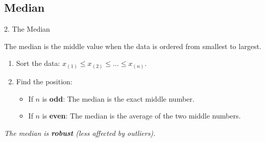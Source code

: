 \subsection{Median}
\begin{frame}{2. The Median}
    \begin{definition}[Median]
        The \alert{median} is the middle value when the data is ordered from smallest to largest.
    \end{definition}
    
    \begin{recipe}
        \begin{enumerate}
            \item Sort the data: $x_{(1)} \le x_{(2)} \le \dots \le x_{(n)}$.
            \item Find the position:
            \begin{itemize}
                \item If $n$ is \textbf{odd}: The median is the exact middle number.
                \item If $n$ is \textbf{even}: The median is the average of the two middle numbers.
            \end{itemize}
        \end{enumerate}
    \end{recipe}
    
    \textit{The median is \textbf{robust} (less affected by outliers).}
\end{frame}

